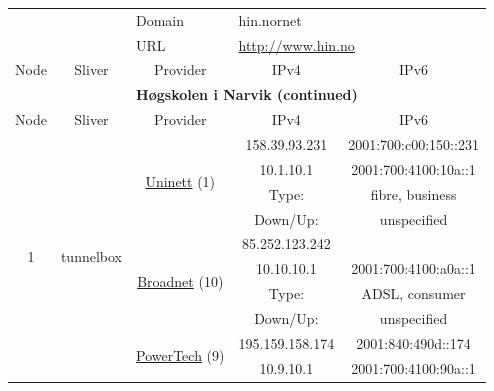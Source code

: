 \begin{small}
\begin{center}
\begin{longtable}{|c|c|c|c|c|c|c|c|}
 \multicolumn{4}{|c|}{} & \multicolumn{1}{|l|}{Domain} & \multicolumn{3}{|l|}{\index{hin.nornet}hin.nornet} \\* \cline{5-5}\cline{6-6}\cline{7-7}\cline{8-8}
 \multicolumn{4}{|c|}{} & \multicolumn{1}{|l|}{URL} & \multicolumn{3}{|l|}{\url{http://www.hin.no}} \\ \hline
 \multicolumn{2}{|p{8em}|}{Node} & \multicolumn{2}{|p{8em}|}{Sliver} & \multicolumn{2}{|p{8em}|}{Provider} & IPv4 & IPv6 \\ \hline
\endfirsthead
\hline
 \multicolumn{8}{|c|}{\textbf{Høgskolen i Narvik (continued)}} \\ \hline
 \multicolumn{2}{|p{8em}|}{Node} & \multicolumn{2}{|p{8em}|}{Sliver} & \multicolumn{2}{|p{8em}|}{Provider} & IPv4 & IPv6 \\ \hline
\endhead
 \multirow{12}{*}{\tiny{1}} & \multicolumn{3}{|c|}{\multirow{12}{*}{\tiny{tunnelbox}}} & \multicolumn{2}{|c|}{\multirow{4}{*}{\tiny{\href{https://www.uninett.no}{Uninett} (1)}}} & \tiny{158.39.93.231} & \tiny{2001:700:c00:150::231} \\* \cline{7-7}\cline{8-8}
  & \multicolumn{3}{|c|}{} & \multicolumn{2}{|c|}{} & \tiny{10.1.10.1} & \tiny{2001:700:4100:10a::1} \\* \cline{7-7}\cline{8-8}
  & \multicolumn{3}{|c|}{} & \multicolumn{2}{|c|}{} & Type: & fibre, business \\* \cline{7-7}\cline{8-8}
  & \multicolumn{3}{|c|}{} & \multicolumn{2}{|c|}{} & Down/Up:  & unspecified \\* \cline{5-5}\cline{6-6}\cline{7-7}\cline{8-8}
  & \multicolumn{3}{|c|}{} & \multicolumn{2}{|c|}{\multirow{4}{*}{\tiny{\href{https://www.broadnet.no}{Broadnet} (10)}}} & \tiny{85.252.123.242} & \frownie{} \\* \cline{7-7}\cline{8-8}
  & \multicolumn{3}{|c|}{} & \multicolumn{2}{|c|}{} & \tiny{10.10.10.1} & \tiny{2001:700:4100:a0a::1} \\* \cline{7-7}\cline{8-8}
  & \multicolumn{3}{|c|}{} & \multicolumn{2}{|c|}{} & Type: & ADSL, consumer \\* \cline{7-7}\cline{8-8}
  & \multicolumn{3}{|c|}{} & \multicolumn{2}{|c|}{} & Down/Up:  & unspecified \\* \cline{5-5}\cline{6-6}\cline{7-7}\cline{8-8}
  & \multicolumn{3}{|c|}{} & \multicolumn{2}{|c|}{\multirow{4}{*}{\tiny{\href{http://www.powertech.no}{PowerTech} (9)}}} & \tiny{195.159.158.174} & \tiny{2001:840:490d::174} \\* \cline{7-7}\cline{8-8}
  & \multicolumn{3}{|c|}{} & \multicolumn{2}{|c|}{} & \tiny{10.9.10.1} & \tiny{2001:700:4100:90a::1} \\* \cline{7-7}\cline{8-8}

\end{longtable}
\end{center}
\end{small}
